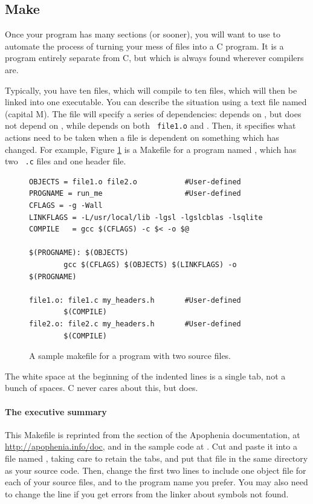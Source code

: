 \documentclass[12pt]{article}
\begin{document}
\subsection{Make} \label{make} 
Once your program has many sections (or sooner), you will want to use
 to automate the process of turning your mess of files into
a C program.  It is a program entirely separate from C, but which
is always found wherever compilers are.

Typically, you have ten  files, which will compile
to ten  files, which will then be linked into one executable.
You can describe the situation using a
text file named  (capital M). The file will specify a
series of dependencies:  depends on , but does
not depend on , while  depends on both {\tt
file1.o} and .  Then, it specifies what actions need to be taken
when a file is dependent on something which has changed.  For example,
Figure \ref{makefig} is a Makefile for a program named , which has two {\tt
.c} files and one header file.

\begin{figure}
\begin{verbatim}
OBJECTS = file1.o file2.o           #User-defined
PROGNAME = run_me                   #User-defined
CFLAGS = -g -Wall
LINKFLAGS = -L/usr/local/lib -lgsl -lgslcblas -lsqlite
COMPILE   = gcc $(CFLAGS) -c $< -o $@

$(PROGNAME): $(OBJECTS)
        gcc $(CFLAGS) $(OBJECTS) $(LINKFLAGS) -o $(PROGNAME)

file1.o: file1.c my_headers.h       #User-defined
        $(COMPILE)
file2.o: file2.c my_headers.h       #User-defined
        $(COMPILE)
\end{verbatim}
\caption{A sample makefile for a program with two source files.}
\label{makefig}
\end{figure}

The white space at the beginning of the indented lines is a single tab,
not a bunch of spaces.  C never cares about this, but 
does.

\paragraph{The executive summary} This Makefile is reprinted from the 
section of the Apophenia documentation, at
\url{http://apophenia.info/doc}, and in the sample code at 
\samplecodelocation. Cut and paste it into a file named
, taking care to retain the tabs, and put that file in
the same directory as your source code. Then, change the first two lines
to include one object file for each of your source files, and
to the program name you prefer.  You may also need to change the
 line if you get errors from the linker about symbols
not found.
\end{document}
